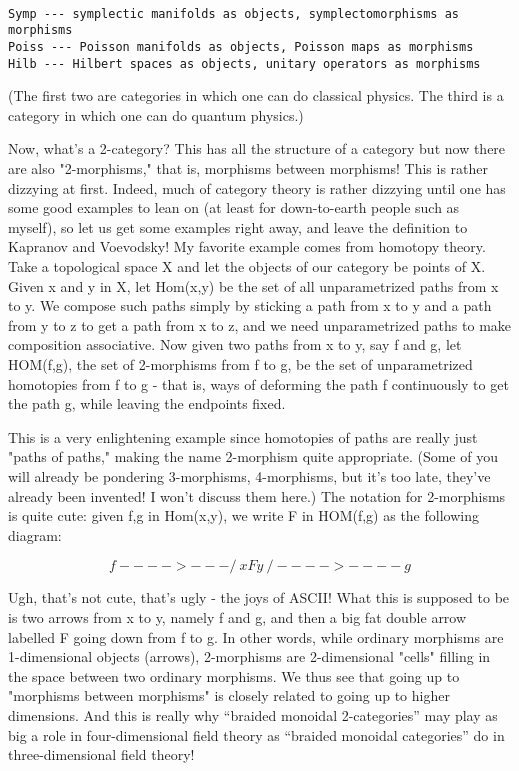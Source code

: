 \begin{verbatim}

Symp --- symplectic manifolds as objects, symplectomorphisms as morphisms
Poiss --- Poisson manifolds as objects, Poisson maps as morphisms
Hilb --- Hilbert spaces as objects, unitary operators as morphisms
\end{verbatim}
    

(The first two are categories in which one can do classical physics.
The third is a category in which one can do quantum physics.)

Now, what's a 2-category?  This has all the structure of a category but
now there are also "2-morphisms," that is, morphisms between morphisms!
This is rather dizzying at first.  Indeed, much of category theory is
rather dizzying until one has some good examples to lean on (at least
for down-to-earth people such as myself), so let us get some examples
right away, and leave the definition to Kapranov and Voevodsky!   My
favorite example comes from homotopy theory.  Take a topological space X
and let the objects of our category be points of X.  Given x and y in X,
let Hom(x,y) be the set of all unparametrized paths from x to y.  We
compose such paths simply by sticking a path from x to y and a path from
y to z to get a path from x to z, and we need unparametrized paths to
make composition associative. Now given two paths from x to y, say f and
g, let HOM(f,g), the set of  2-morphisms from f to g, be the set of
unparametrized homotopies from f to g - that is, ways of deforming the
path f continuously to get the path g, while leaving the endpoints fixed.  

This is a very enlightening example since homotopies of paths are really
just "paths of paths," making the name 2-morphism quite appropriate.
(Some of you will already be pondering 3-morphisms, 4-morphisms, but it's
too late, they've already been invented!  I won't discuss them here.)
The notation for 2-morphisms is quite cute: given f,g in Hom(x,y), we
write F in HOM(f,g) as the following diagram:


$$

                      f
                  ---->---
                 /         \
                x     F     y
                 \         /
                  ---->----
                      g
$$
    

Ugh, that's not cute, that's ugly - the joys of ASCII!  What this is
supposed to be is two arrows from x to y, namely f and g, and then
a big fat double arrow labelled F going down from f to g.  In other
words, while ordinary morphisms are 1-dimensional objects (arrows),
2-morphisms are 2-dimensional "cells" filling in the space between two 
ordinary morphisms.  We thus see that going up to "morphisms between
morphisms" is closely related to going up to higher dimensions.  And
this is really why ``braided monoidal 2-categories'' may play as big a
role in four-dimensional field theory as ``braided monoidal categories''
do in three-dimensional field theory!

